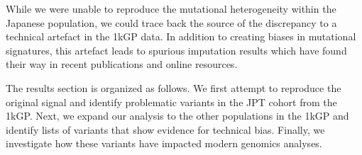 \documentclass[9pt,article]{template}
\begin{document}
While we were unable to reproduce the mutational heterogeneity within the Japanese population, we could trace back the source of the discrepancy to a technical artefact in the 1kGP data.
In addition to creating biases in mutational signatures, this artefact leads to spurious imputation results which have found their way in recent publications and online resources.


The results section is organized as follows.
We first attempt to reproduce the original signal and identify problematic variants in the JPT cohort from the 1kGP. 
Next, we expand our analysis to the other populations in the 1kGP and identify lists of variants that show evidence for technical bias.
Finally, we investigate how these variants have impacted modern genomics analyses.
  

\begin{figure}

\end{figure}
\end{document}
